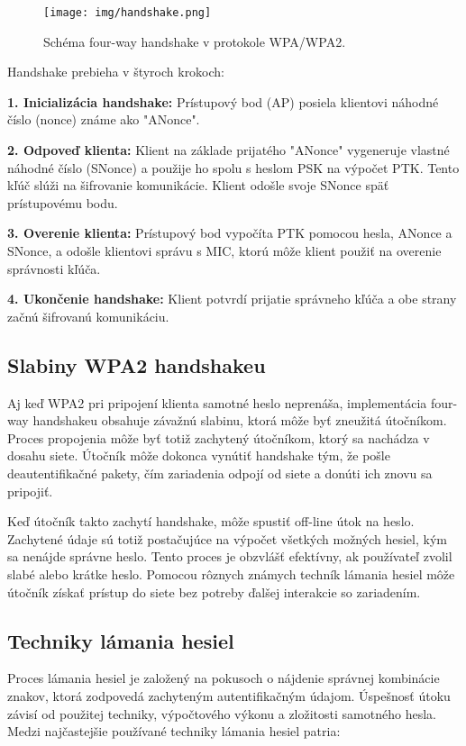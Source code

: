 \documentclass[12pt, twoside]{book}
\begin{document}
\begin{figure}[H] 
    \centering
    \texttt{[image: img/handshake.png]}
    \caption{Schéma four-way handshake v protokole WPA/WPA2.}
    \label{fig:handshake}
\end{figure}

Handshake prebieha v štyroch krokoch:

\textbf{1. Inicializácia handshake:} Prístupový bod (AP) posiela klientovi náhodné číslo (nonce) známe ako "ANonce".

\textbf{2. Odpoveď klienta:} Klient na základe prijatého "ANonce" vygeneruje vlastné náhodné číslo (SNonce) a použije ho spolu s heslom PSK na výpočet PTK. Tento kľúč slúži na šifrovanie komunikácie. Klient odošle svoje SNonce späť prístupovému bodu.

\textbf{3. Overenie klienta:} Prístupový bod vypočíta PTK pomocou hesla, ANonce a SNonce, a odošle klientovi správu s MIC, ktorú môže klient použiť na overenie správnosti kľúča.

\textbf{4. Ukončenie handshake:} Klient potvrdí prijatie správneho kľúča a obe strany začnú šifrovanú komunikáciu.


\subsection{Slabiny WPA2 handshakeu}
Aj keď WPA2 pri pripojení klienta samotné heslo neprenáša, implementácia four-way handshakeu obsahuje závažnú slabinu, ktorá môže byť zneužitá útočníkom. Proces propojenia môže byť totiž zachytený útočníkom, ktorý sa nachádza v dosahu siete. Útočník môže dokonca vynútiť handshake tým, že pošle deautentifikačné pakety, čím zariadenia odpojí od siete a donúti ich znovu sa pripojiť.

Keď útočník takto zachytí handshake, môže spustiť off-line útok na heslo. Zachytené údaje sú totiž postačujúce na výpočet všetkých možných hesiel, kým sa nenájde správne heslo. Tento proces je obzvlášť efektívny, ak používateľ zvolil slabé alebo krátke heslo. Pomocou rôznych známych techník lámania hesiel môže útočník získať prístup do siete bez potreby ďalšej interakcie so zariadením.

\subsection{Techniky lámania hesiel}
Proces lámania hesiel je založený na pokusoch o nájdenie správnej kombinácie znakov, ktorá zodpovedá zachyteným autentifikačným údajom. Úspešnosť útoku závisí od použitej techniky, výpočtového výkonu a zložitosti samotného hesla. Medzi najčastejšie používané techniky lámania hesiel patria:
\end{document}

